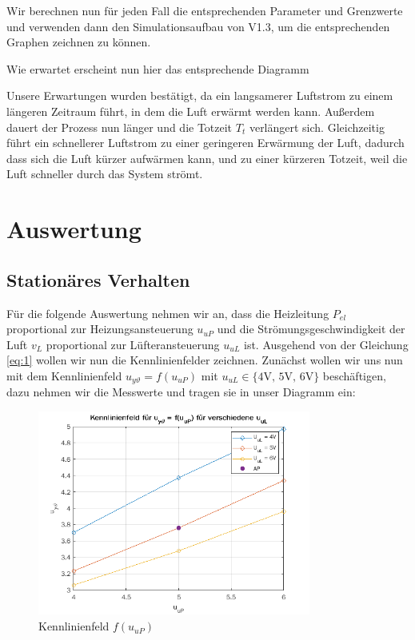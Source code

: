 \documentclass{report}
\begin{document}
Wir berechnen nun für jeden Fall die entsprechenden Parameter und Grenzwerte und verwenden dann den Simulationsaufbau von V1.3, um die entsprechenden Graphen zeichnen zu können.



Wie erwartet erscheint nun hier das entsprechende Diagramm

Unsere Erwartungen wurden bestätigt, da ein langsamerer Luftstrom zu einem längeren Zeitraum führt, in dem die Luft erwärmt werden kann. Außerdem dauert der Prozess nun länger und die Totzeit $T_{t}$ verlängert sich. Gleichzeitig führt ein schnellerer Luftstrom zu einer geringeren Erwärmung der Luft, dadurch dass sich die Luft kürzer aufwärmen kann, und zu einer kürzeren Totzeit, weil die Luft schneller durch das System strömt.

\newpage

\section{Auswertung}

\subsection{Stationäres Verhalten}
\label{sec:stat-verh}

Für die folgende Auswertung nehmen wir an, dass die Heizleitung $P_{el}$ proportional zur Heizungsansteuerung $u_{uP}$ und die Strömungsgeschwindigkeit der Luft $v_{L}$ proportional zur Lüfteransteuerung $u_{uL}$ ist. Ausgehend von der Gleichung \ref{eq:1} wollen wir nun die Kennlinienfelder zeichnen.
Zunächst wollen wir uns nun mit dem Kennlinienfeld $u_{y\vartheta} = f(u_{uP})$ mit $u_{uL} \in \{\text{4V, 5V, 6V}\}$ beschäftigen, dazu nehmen wir die Messwerte und tragen sie in unser Diagramm ein:

\begin{figure}[h]
  \centering
  \includegraphics[width=0.8\textwidth]{../assets/images/RTP/kennlinieA11rtp1.png}
  \caption{Kennlinienfeld $f(u_{uP})$}
  \label{fig:kennuy}
\end{figure}
\end{document}
